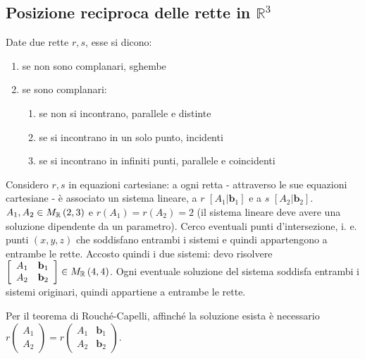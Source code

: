 \documentclass{article}
\begin{document}
\subsection{Posizione reciproca delle rette in $%
\mathbb{R}
^{3}$}

Date due rette $r,s$, esse si dicono:

\begin{enumerate}
\item se non sono complanari, sghembe

\item se sono complanari:

\begin{enumerate}
\item se non si incontrano, parallele e distinte

\item se si incontrano in un solo punto, incidenti

\item se si incontrano in infiniti punti, parallele e coincidenti
\end{enumerate}
\end{enumerate}

Considero $r,s$ in equazioni cartesiane: a ogni retta - attraverso le sue
equazioni cartesiane - \`{e} associato un sistema lineare, a $r$ $\left[
A_{1}|\mathbf{b}_{1}\right] $ e a $s$ $\left[ A_{2}|\mathbf{b}_{2}\right] $. 
$A_{1},A_{2}\in M_{\mathbf{%
\mathbb{R}
}}\left( 2,3\right) $ e $r\left( A_{1}\right) =r\left( A_{2}\right) =2$ (il
sistema lineare deve avere una soluzione dipendente da un parametro). Cerco
eventuali punti d'intersezione, i. e. punti $\left( x,y,z\right) $ che
soddisfano entrambi i sistemi e quindi appartengono a entrambe le rette.
Accosto quindi i due sistemi: devo risolvere $\left[ 
\begin{array}{cc}
A_{1} & \mathbf{b}_{1} \\ 
A_{2} & \mathbf{b}_{2}%
\end{array}%
\right] \in M_{%
\mathbb{R}
}\left( 4,4\right) $. Ogni eventuale soluzione del sistema soddisfa entrambi
i sistemi originari, quindi appartiene a entrambe le rette.

Per il teorema di Rouch\'{e}-Capelli, affinch\'{e} la soluzione esista \`{e}
necessario $r\left( 
\begin{array}{c}
A_{1} \\ 
A_{2}%
\end{array}%
\right) =r\left( 
\begin{array}{cc}
A_{1} & \mathbf{b}_{1} \\ 
A_{2} & \mathbf{b}_{2}%
\end{array}%
\right) $.
\end{document}

